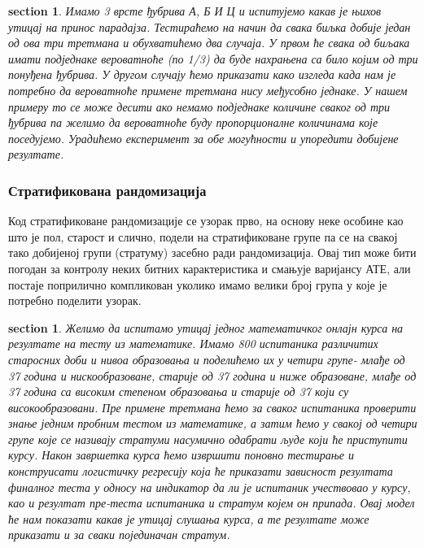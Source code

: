 \documentclass[12pt, a4paper]{article}
\newtheorem{primer}[Пример]{section}
\begin{document}
\begin{primer}
Имамо 3 врсте ђубрива А, Б И Ц и испитујемо какав је њихов утицај на принос парадајза. 
Тестираћемо на начин да свака биљка добије један од ова три третмана и обухватићемо два случаја.
У првом ће свака од биљака имати подједнаке вероватноће (по 1/3) да буде нахрањена са било којим 
од три понуђена ђубрива. У другом случају ћемо приказати како изгледа када нам је потребно да 
вероватноће примене третмана нису међусобно једнаке. У нашем примеру то се може десити ако немамо 
подједнаке количине сваког од три ђубрива па желимо да вероватноће буду пропорционалне количинама 
које поседујемо. Урадићемо експеримент за обе могућности и упоредити добијене резултате.
\end{primer}

\subsubsection{Стратификована рандомизација}

Код стратификоване рандомизације се узорак прво, на основу неке особине као што је пол, старост и 
слично, подели на стратификоване групе па се на свакој тако добијеној групи (стратуму) засебно 
ради рандомизација. Овај тип може бити погодан за контролу неких битних карактеристика и смањује 
варијансу АТЕ, али постаје поприлично компликован уколико имамо велики број група у које је 
потребно поделити узорак. 

\begin{primer}
Желимо да испитамо утицај једног математичког онлајн курса на резултате на тесту из математике.
Имамо 800 испитаника различитих старосних доби и нивоа образовања и поделићемо их у четири групе-
млађе од 37 година и нискообразоване, старије од 37 година и ниже образоване, млађе од 37 година 
са високим степеном образовања и старије од 37 који су високообразовани.
Пре примене третмана ћемо за сваког испитаника проверити знање једним пробним тестом из математике, 
а затим ћемо у свакој од четири групе које се називају стратуми насумично одабрати људе који ће 
приступити курсу. Након завршетка курса ћемо извршити поновно тестирање и конструисати логистичку 
регресију која ће приказати зависност резултата финалног теста у односу на индикатор да ли је 
испитаник учествовао у курсу, као и резултат пре-теста испитаника и стратум којем он припада.
Овај модел ће нам показати какав је утицај слушања курса, а те резултате може приказати и за сваки 
појединачан стратум.
\end{primer}
\end{document}
